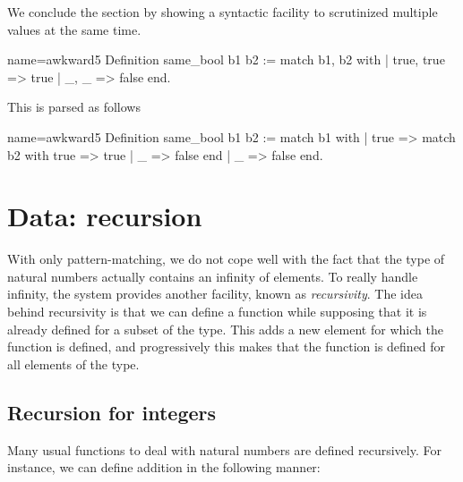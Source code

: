 We conclude the section by showing a syntactic facility to scrutinized
multiple values at the same time.

\begin{coq}{name=awkward5}{}
Definition same_bool b1 b2 :=
  match b1, b2 with
  | true, true => true
  | _, _ => false
  end.
\end{coq}

This is parsed as follows

\begin{coq}{name=awkward5}{}
Definition same_bool b1 b2 :=
  match b1 with
  | true => match b2 with true => true | _ => false end
  | _ => false
  end.
\end{coq}

\section{Data: recursion}

With only pattern-matching, we do not cope well with the fact that the
type  of natural numbers actually contains an infinity of
elements.  To really handle infinity, the \Coq{} system provides another
facility, known as {\em recursivity}.  The idea behind recursivity is
that we can define a function while supposing that it is already
defined for a subset of the type.  This adds a new element for which
the function is defined, and progressively this makes that the
function is defined for all elements of the type.

\subsection{Recursion for integers}

Many usual functions to deal with natural numbers are
defined recursively.  For instance, we can define addition in the
following manner:

